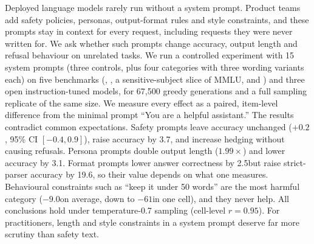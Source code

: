 Deployed language models rarely run without a system prompt. Product teams add safety policies, personas, output-format rules and style constraints, and these prompts stay in context for every request, including requests they were never written for. We ask whether such prompts change accuracy, output length and refusal behaviour on unrelated tasks. We run a controlled experiment with 15 system prompts (three controls, plus four categories with three wording variants each) on five benchmarks (\gsm, \arc, a sensitive-subject slice of MMLU, \tqa and \drop) and three open instruction-tuned models, for 67,500 greedy generations and a full sampling replicate of the same size. We measure every effect as a paired, item-level difference from the minimal prompt ``You are a helpful assistant.'' The results contradict common expectations. Safety prompts leave accuracy unchanged ($+0.2$\pp, 95\% CI $[-0.4, 0.9]$), raise \tqa accuracy by 3.7\pp, and increase hedging without causing refusals. Persona prompts double output length ($1.99\times$) and lower accuracy by 3.1\pp. Format prompts lower answer correctness by 2.5\pp but raise strict-parser accuracy by 19.6\pp, so their value depends on what one measures. Behavioural constraints such as ``keep it under 50 words'' are the most harmful category ($-9.0$\pp on average, down to $-61$\pp in one cell), and they never help. All conclusions hold under temperature-0.7 sampling (cell-level $r=0.95$). For practitioners, length and style constraints in a system prompt deserve far more scrutiny than safety text.
